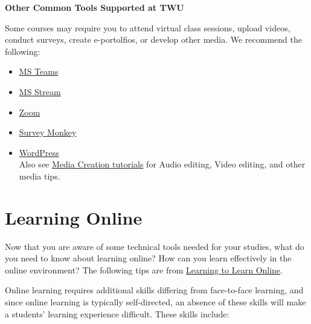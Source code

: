 \documentclass[
]{book}
\providecommand{\tightlist}{%
  \setlength{\itemsep}{0pt}\setlength{\parskip}{0pt}}
\theoremstyle{definition}
\theoremstyle{definition}
\theoremstyle{definition}
\theoremstyle{definition}
\theoremstyle{remark}
\begin{document}
\textbf{Other Common Tools Supported at TWU}

Some courses may require you to attend virtual class sessions, upload videos, conduct surveys, create e-portolfios, or develop other media. We recommend the following:

\begin{itemize}
\tightlist
\item
  \href{https://trinitywestern.teamdynamix.com/TDClient/1904/Portal/KB/?CategoryID=17821\&SIDs=11353}{MS Teams}\\
\item
  \href{https://trinitywestern.teamdynamix.com/TDClient/1904/Portal/KB/?CategoryID=23454}{MS Stream}\\
\item
  \href{https://trinitywestern.teamdynamix.com/TDClient/1904/Portal/KB/?CategoryID=17478}{Zoom}\\
\item
  \href{https://trinitywestern.teamdynamix.com/TDClient/1904/Portal/KB/ArticleDet?ID=47076}{Survey Monkey}\\
\item
  \href{https://trinitywestern.teamdynamix.com/TDClient/1904/Portal/KB/?CategoryID=4746}{WordPress}\\
  Also see \href{https://trinitywestern.teamdynamix.com/TDClient/1904/Portal/KB/?CategoryID=6940}{Media Creation tutorials} for Audio editing, Video editing, and other media tips.
\end{itemize}

\hypertarget{learning-online}{%
\section{Learning Online}\label{learning-online}}

Now that you are aware of some technical tools needed for your studies, what do you need to know about learning online? How can you learn effectively in the online environment? The following tips are from \href{https://pressbooks.bccampus.ca/learningtolearnonlinereview/chapter/learning-skills/}{Learning to Learn Online}.

Online learning requires additional skills differing from face-to-face learning, and since online learning is typically self-directed, an absence of these skills will make a students' learning experience difficult. These skills include:
\end{document}
